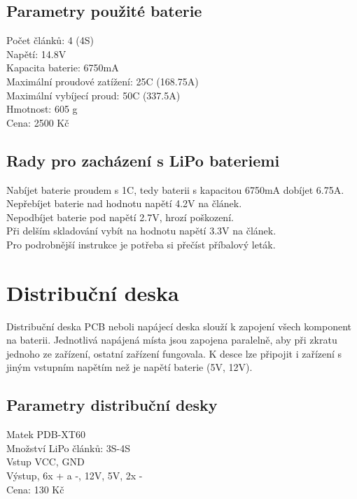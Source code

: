 \subsection{Parametry použité baterie} 
Počet článků: 4 (4S)\\
Napětí: 14.8V\\
Kapacita baterie: 6750mA\\
Maximální proudové zatížení: 25C (168.75A)\\
Maximální vybíjecí proud: 50C (337.5A)\\
Hmotnost: 605 g\\
Cena: 2500 Kč\\

\subsection{Rady pro zacházení s LiPo bateriemi} 
Nabíjet baterie proudem s 1C, tedy baterii s kapacitou 6750mA dobíjet 6.75A.\\
Nepřebíjet baterie nad hodnotu napětí 4.2V na článek.\\
Nepodbíjet baterie pod napětí 2.7V, hrozí poškození.\\
Při delším skladování vybít na hodnotu napětí 3.3V na článek.\\
Pro podrobnější instrukce je potřeba si přečíst příbalový leták.\\

\section{Distribuční deska} 
Distribuční deska PCB neboli napájecí deska slouží k zapojení všech  komponent na baterii. Jednotlivá napájená místa jsou zapojena paralelně, aby při zkratu jednoho ze zařízení, ostatní zařízení fungovala. K desce lze připojit i zařízení s jiným vstupním napětím než je napětí baterie (5V, 12V).\\

\subsection{Parametry distribuční desky}
Matek PDB-XT60\\
Množství LiPo článků: 3S-4S\\
Vstup VCC, GND\\
Výstup, 6x + a -, 12V, 5V, 2x -\\
Cena: 130 Kč\\

